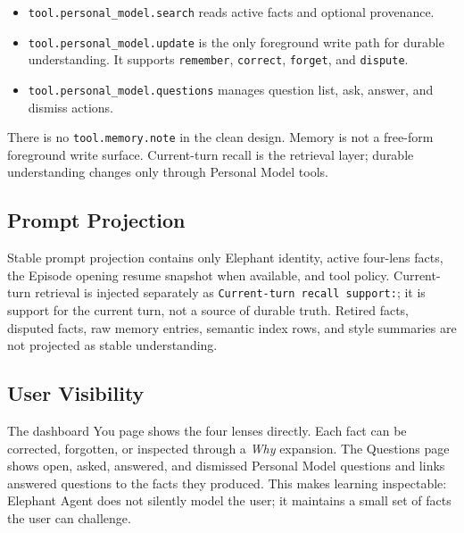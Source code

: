 \begin{itemize}
  \item \texttt{tool.personal\_model.search} reads active facts and optional
  provenance.
  \item \texttt{tool.personal\_model.update} is the only foreground write path
  for durable understanding. It supports \texttt{remember}, \texttt{correct},
  \texttt{forget}, and \texttt{dispute}.
  \item \texttt{tool.personal\_model.questions} manages question list, ask,
  answer, and dismiss actions.
\end{itemize}

There is no \texttt{tool.memory.note} in the clean design. Memory is not a
free-form foreground write surface. Current-turn recall is the retrieval layer;
durable understanding changes only through Personal Model tools.

\subsection{Prompt Projection}

Stable prompt projection contains only Elephant identity, active four-lens facts,
the Episode opening resume snapshot when available, and tool policy.
Current-turn retrieval is injected separately as \texttt{Current-turn recall support:}; it is
support for the current turn, not a source of durable truth. Retired facts,
disputed facts, raw memory entries, semantic index rows, and style summaries
are not projected as stable understanding.

\subsection{User Visibility}

The dashboard You page shows the four lenses directly. Each fact can be
corrected, forgotten, or inspected through a \textit{Why} expansion. The
Questions page shows open, asked, answered, and dismissed Personal Model
questions and links answered questions to the facts they produced. This makes
learning inspectable: Elephant Agent does not silently model the user; it maintains a
small set of facts the user can challenge.
